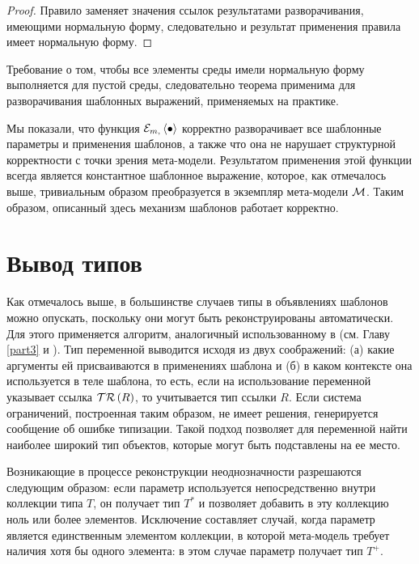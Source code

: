 {\begin{proof}
Правило  заменяет значения ссылок результатами разворачивания, имеющими нормальную форму, следовательно и результат применения правила имеет нормальную форму.
\end{proof}

Требование о том, чтобы все элементы среды имели нормальную форму выполняется для пустой среды, следовательно теорема применима для разворачивания шаблонных выражений, применяемых на практике.

Мы показали, что функция $\mathcal{E}_{m, } \left\langle \bullet \right\rangle$ корректно разворачивает все шаблонные параметры и применения шаблонов, а также что она не нарушает структурной корректности с точки зрения мета-модели. Результатом применения этой функции всегда является константное шаблонное выражение, которое, как отмечалось выше, тривиальным образом преобразуется в экземпляр мета-модели $\mathcal{M}$. Таким образом, описанный здесь механизм шаблонов работает корректно.

\section{Вывод типов}

Как отмечалось выше, в большинстве случаев типы в объявлениях шаблонов можно опускать, поскольку они могут быть реконструированы автоматически. Для этого применяется алгоритм, аналогичный использованному в \ATF{} (см. Главу \ref{part3} и \cite{Pierce}). Тип переменной выводится исходя из двух соображений: (а) какие аргументы ей присваиваются в применениях шаблона и (б) в каком контексте она используется в теле шаблона, то есть, если на использование переменной указывает ссылка $\mathcal{TR}\left(R\right)$, то учитывается тип ссылки $R$. Если система ограничений, построенная таким образом, не имеет решения, генерируется сообщение об ошибке типизации. Такой подход позволяет для переменной найти наиболее широкий тип объектов, которые могут быть подставлены на ее место.

Возникающие в процессе реконструкции неоднозначности разрешаются следующим образом: если параметр используется непосредственно внутри коллекции типа $T$, он получает тип $T^*$ и позволяет добавить в эту коллекцию ноль или более элементов. Исключение составляет случай, когда параметр является единственным элементом коллекции, в которой мета-модель требует наличия хотя бы одного элемента: в этом случае параметр получает тип $T^+$. 



}
